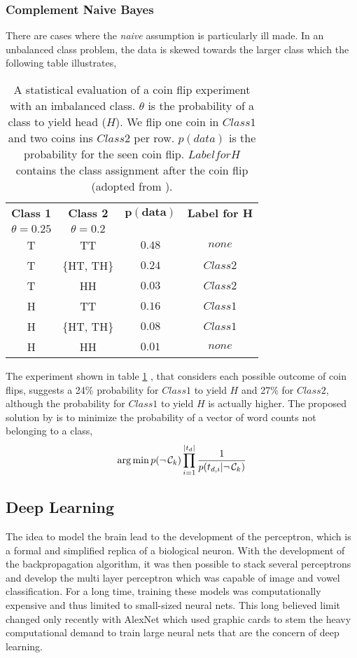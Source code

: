 \subsubsection{Complement Naive Bayes}
There are cases where the \textsl{naive} assumption is particularly ill made. In an unbalanced class problem, the data is skewed towards the larger class which the following table illustrates,

\begin{table}[h!]
  \centering
  \caption{A statistical evaluation of a coin flip experiment with an imbalanced class. $\theta$ is the probability of a class to yield head ($H$). We flip one coin in $Class 1$ and two coins ins $Class 2$ per row. $p(data)$ is the probability for the seen coin flip. $Label for H$ contains the class assignment after the coin flip (adopted from \cite{Rennie2003}).}
  \setlength{\tabcolsep}{1.5em}
  \begin{tabular}{@{}cccc@{}}
    \toprule
    \textbf{Class 1} & \textbf{Class 2} & $\mathbf{p(data)}$ & \textbf{Label for H} \\
    $\theta = 0.25$ & $\theta=0.2$ & & \\
    \midrule
    T & TT & $0.48$ & $none$ \\
    T & \{HT, TH\} & $0.24$ & $Class 2$ \\
    T & HH & $0.03$ & $Class 2$ \\
    H & TT & $0.16$ & $Class 1$ \\
    H & \{HT, TH\} & $0.08$ & $Class 1$ \\
    H & HH & $0.01$ & $none$ \\
    \bottomrule
  \end{tabular}
  \label{table:coinflip}
\end{table}
The experiment shown in table \ref{table:coinflip} , that considers each possible outcome of coin flips, suggests a 24\% probability for $Class 1$ to yield $H$ and 27\% for $Class 2$, although the probability for $Class 1$ to yield $H$ is actually higher.
The proposed solution by \cite{Rennie2003} is to minimize the probability of a vector of word counts not belonging to a class,
\[\operatorname*{arg\,min} p(\neg\, \mathcal{C}_k) \prod_{i=1}^{|t_{d}|} \frac{1}{p(t_{d,i}|\neg\, \mathcal{C}_k)} \]

\subsection{Deep Learning}
The idea to model the brain lead to the development of the perceptron, which is a formal and simplified replica of a biological neuron. With the development of the backpropagation algorithm, it was then possible to stack several perceptrons and develop the multi layer perceptron which was capable of image and vowel classification. For a long time, training these models was computationally expensive and thus limited to small-sized neural nets. This long believed limit changed only recently with AlexNet which used graphic cards to stem the heavy computational demand to train large neural nets that are the concern of deep learning.

